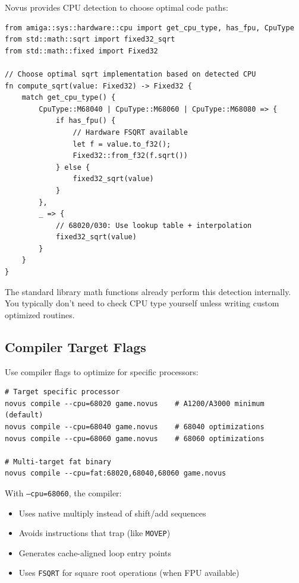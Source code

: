 Novus provides CPU detection to choose optimal code paths:

\begin{lstlisting}
from amiga::sys::hardware::cpu import get_cpu_type, has_fpu, CpuType
from std::math::sqrt import fixed32_sqrt
from std::math::fixed import Fixed32

// Choose optimal sqrt implementation based on detected CPU
fn compute_sqrt(value: Fixed32) -> Fixed32 {
    match get_cpu_type() {
        CpuType::M68040 | CpuType::M68060 | CpuType::M68080 => {
            if has_fpu() {
                // Hardware FSQRT available
                let f = value.to_f32();
                Fixed32::from_f32(f.sqrt())
            } else {
                fixed32_sqrt(value)
            }
        },
        _ => {
            // 68020/030: Use lookup table + interpolation
            fixed32_sqrt(value)
        }
    }
}
\end{lstlisting}

\begin{tipbox}
The standard library math functions already perform this detection internally. You typically don't need to check CPU type yourself unless writing custom optimized routines.
\end{tipbox}

\subsection{Compiler Target Flags}

Use compiler flags to optimize for specific processors:

\begin{lstlisting}[style=bash]
# Target specific processor
novus compile --cpu=68020 game.novus    # A1200/A3000 minimum (default)
novus compile --cpu=68040 game.novus    # 68040 optimizations
novus compile --cpu=68060 game.novus    # 68060 optimizations

# Multi-target fat binary
novus compile --cpu=fat:68020,68040,68060 game.novus
\end{lstlisting}

With \texttt{--cpu=68060}, the compiler:
\begin{itemize}
\item Uses native multiply instead of shift/add sequences
\item Avoids instructions that trap (like \texttt{MOVEP})
\item Generates cache-aligned loop entry points
\item Uses \texttt{FSQRT} for square root operations (when FPU available)
\end{itemize}

